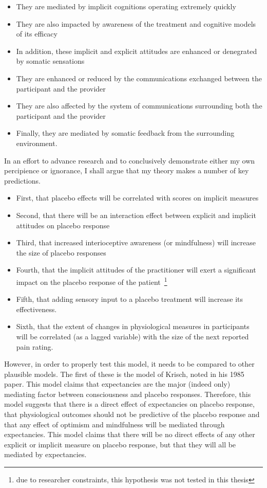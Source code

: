 \begin{itemize}
\item They are mediated by implicit cognitions operating extremely quickly
\item They are also impacted by awareness of the treatment and cognitive models of its efficacy
\item In addition, these implicit and explicit attitudes are enhanced or denegrated by somatic sensations
\item They are enhanced or reduced by the communications exchanged between the participant and the provider
\item They are also affected by the system of communications surrounding both the participant and the provider
\item Finally, they are mediated by somatic feedback from the surrounding environment.
\end{itemize}
 
In an effort to advance research and to conclusively demonstrate either my own percipience or ignorance, I shall argue that my theory makes a number of key predictions. 

\begin{itemize}
\item First, that placebo effects will be correlated with scores on implicit measures
\item Second, that there will be an interaction effect between explicit and implicit attitudes on placebo response
\item Third, that increased interioceptive awareness (or mindfulness) will increase the size of placebo responses
\item Fourth, that the implicit attitudes of the practitioner will exert a significant impact on the placebo response of the patient~\footnote{due to researcher constraints, this hypothesis was not tested in this thesis}
\item Fifth, that adding sensory input to a placebo treatment will increase its effectiveness. 
\item Sixth, that the extent of changes in physiological measures in participants will be correlated (as a lagged variable) with the size of the next reported pain rating.
\end{itemize}

However, in order to properly test this model, it needs to be compared to other plausible models. The first of these is the model of Krisch, noted in his 1985 paper. This model claims that expectancies are the major (indeed only) mediating factor between consciousness and placebo responses. Therefore, this model suggests that there is a direct effect of expectancies on placebo response, that physiological outcomes should not be predictive of the placebo response and that any effect of optimism and mindfulness will be mediated through expectancies. This model claims that there will be no direct effects of any other explicit or implicit measure on placebo response, but that they will all be mediated by expectancies. 

